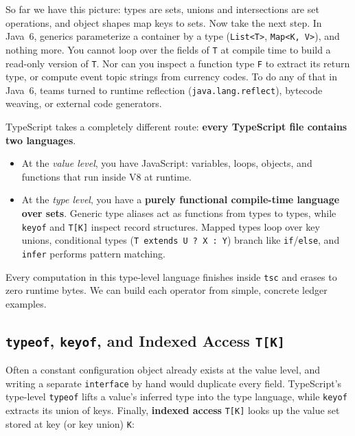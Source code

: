 So far we have this picture: types are sets, unions and intersections are set operations, and object shapes map keys to sets. Now take the next step. In Java~6, generics parameterize a container by a type (\texttt{List<T>}, \texttt{Map<K, V>}), and nothing more. You cannot loop over the fields of \texttt{T} at compile time to build a read-only version of \texttt{T}. Nor can you inspect a function type \texttt{F} to extract its return type, or compute event topic strings from currency codes. To do any of that in Java~6, teams turned to runtime reflection (\texttt{java.lang.reflect}), bytecode weaving, or external code generators.

TypeScript takes a completely different route: \textbf{every TypeScript file contains two languages}.
\begin{itemize}
  \item At the \emph{value level}, you have JavaScript: variables, loops, objects, and functions that run inside V8 at runtime.
  \item At the \emph{type level}, you have a \textbf{purely functional compile-time language over sets}. Generic type aliases act as functions from types to types, while \texttt{keyof} and \texttt{T[K]} inspect record structures. Mapped types loop over key unions, conditional types (\texttt{T extends U ? X : Y}) branch like \texttt{if}/\texttt{else}, and \texttt{infer} performs pattern matching.
\end{itemize}
Every computation in this type-level language finishes inside \texttt{tsc} and erases to zero runtime bytes. We can build each operator from simple, concrete ledger examples.

\subsection{\texttt{typeof}, \texttt{keyof}, and Indexed Access \texttt{T[K]}}

Often a constant configuration object already exists at the value level, and writing a separate \texttt{interface} by hand would duplicate every field. TypeScript's type-level \texttt{typeof} lifts a value's inferred type into the type language, while \texttt{keyof} extracts its union of keys. Finally, \textbf{indexed access} \texttt{T[K]} looks up the value set stored at key (or key union) \texttt{K}:

